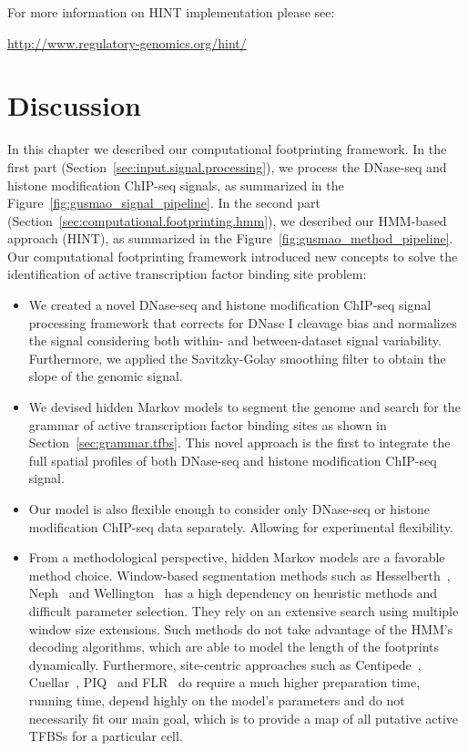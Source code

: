 For more information on HINT implementation please see:

\begin{center}
\url{http://www.regulatory-genomics.org/hint/}
\end{center}


\section{Discussion}
\label{sec:discussion.3}

In this chapter we described our computational footprinting framework. In the first part (Section~\ref{sec:input.signal.processing}), we process the DNase-seq and histone modification ChIP-seq signals, as summarized in the Figure~\ref{fig:gusmao_signal_pipeline}. In the second part (Section~\ref{sec:computational.footprinting.hmm}), we described our HMM-based approach (HINT), as summarized in the Figure~\ref{fig:gusmao_method_pipeline}. Our computational footprinting framework introduced new concepts to solve the identification of active transcription factor binding site problem:

\begin{itemize}
\item We created a novel DNase-seq and histone modification ChIP-seq signal processing framework that corrects for DNase I cleavage bias and normalizes the signal considering both within- and between-dataset signal variability. Furthermore, we applied the Savitzky-Golay smoothing filter to obtain the slope of the genomic signal.
\item We devised hidden Markov models to segment the genome and search for the grammar of active transcription factor binding sites as shown in Section~\ref{sec:grammar.tfbs}. This novel approach is the first to integrate the full spatial profiles of both DNase-seq and histone modification ChIP-seq signal.
\item Our model is also flexible enough to consider only DNase-seq or histone modification ChIP-seq data separately. Allowing for experimental flexibility.
\item From a methodological perspective, hidden Markov models are a favorable method choice. Window-based segmentation methods such as Hesselberth~\cite{hesselberth2009}, Neph~\cite{neph2012a} and Wellington~\cite{piper2013} has a high dependency on heuristic methods and difficult parameter selection. They rely on an extensive search using multiple window size extensions. Such methods do not take advantage of the HMM's decoding algorithms, which are able to model the length of the footprints dynamically. Furthermore, site-centric approaches such as Centipede~\cite{pique2011}, Cuellar~\cite{cuellar2012}, PIQ~\cite{sherwood2014} and FLR~\cite{yardimci2014} do require a much higher preparation time, running time, depend highly on the model's parameters and do not necessarily fit our main goal, which is to provide a map of all putative active TFBSs for a particular cell.
\end{itemize}


